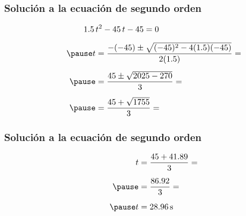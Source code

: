 \documentclass[14pt]{beamer}
\begin{document}
\begin{frame}
\frametitle{Solución a la ecuación de segundo orden}
\begin{eqnarray*}
\begin{aligned}
1.5 \, &t^{2} - 45 \, t - 45 = 0 \\[0.5em] \pause
t &= \dfrac{- (-45) \pm \sqrt{(-45)^{2} - 4 (1.5)(-45)}}{2 (1.5)} = \\[0.5em] \pause
&= \dfrac{45 \pm \sqrt{2025 - 270}}{3} = \\[0.5em] \pause
&= \dfrac{45 + \sqrt{1755}}{3} = 
\end{aligned}
\end{eqnarray*}
\end{frame}
\begin{frame}
\frametitle{Solución a la ecuación de segundo orden}
\begin{eqnarray*}
\begin{aligned}
t &= \dfrac{45 + 41.89}{3} = \\[0.5em] \pause
&= \dfrac{86.92}{3} = \\[0.5em] \pause 
t &= \SI{28.96}{\second}
\end{aligned}
\end{eqnarray*}
\end{frame}
\end{document}
